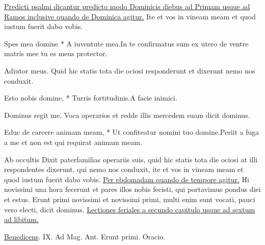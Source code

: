 \begin{multicols*}{2}
\ul{Predicti psalmi dicantur predicto modo Dominicis diebus ad Primam usque ad Ramos inclusive quando de Dominica agitur.}
 Ite et vos in vineam meam et quod iustum fuerit dabo vobis.
\begin{responsory-breve}
{Spes mea domine * A iuventute mea.}{In te confirmatus sum ex utero de ventre matris mee tu es meus protector.}
\end{responsory-breve}
\newline \V Adiutor meus.
 Quid hic statis tota die ociosi responderunt et dixerunt nemo nos conduxit.
\begin{responsory-breve}
{Esto nobis domine, * Turris fortitudinis.}{A facie inimici.}
\end{responsory-breve}
\newline \V Dominus regit me.
 Voca operarios et redde illis mercedem suam dicit dominus.
\begin{responsory-breve}
{Educ de carcere animam meam, * Ut confiteatur nomini tuo domine.}{Periit a fuga a me et non est qui requirat animam meam.}
\end{responsory-breve}
\newline \V Ab occultis
 Dixit paterfamilias operariis suis, quid hic statis tota die ociosi at illi respondentes dixerunt, qui nemo nos conduxit, ite et vos in vineam meam et quod iustum fuerit dabo vobis.
\newline \ul{Per ebdomadam quando de tempore agitur.}
 Hi novissimi una hora fecerunt et pares illos nobis fecisti, qui portavimus pondus diei et estus.
 Erunt primi novissimi et novissimi primi, multi enim sunt vocati, pauci vero electi, dicit dominus.
\newline \ul{Lectiones feriales a secundo capitulo usque ad sextum ad libitum.}
{\color{Red} }
\par {} \R \hyperlink{benedicens-ergo}{Benedicens}. {\color{Red} IX. Ad Mag. Ant.} Erunt primi. {\color{Red} Oracio.} 

\end{multicols*}
